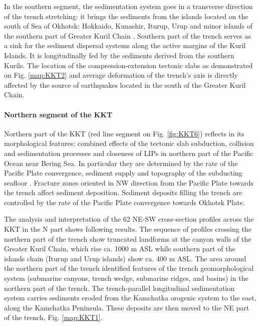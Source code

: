 \documentclass[11pt,a4paper]{report}
\begin{document}
{In the southern segment, the sedimentation system goes in a transverse direction of the trench stretching: it brings the sediments from the islands located on the south of Sea of Okhotsk: Hokkaido, Kunashir, Iturup, Urup and minor islands of the southern part of Greater Kuril Chain \cite{Lemenkova202011}. Southern part of the trench serves as a sink for the sediment dispersal systems along the active margins of the Kuril Islands. It is longitudinally fed by the sediments derived from the southern Kurils. The location of the compression-extension tectonic slabs as demonstrated on Fig. \ref{map:KKT2} and average deformation of the trench’s axis is directly affected by the source of earthquakes located in the south of the Greater Kuril Chain.

\paragraph{Northern segment of the \ac{KKT}}
Northern part of the \ac{KKT} (red line segment on Fig. \ref{fig:KKT6}) reflects in its morphological features: combined effects of the tectonic slab subduction, collision and sedimentation processes and closeness of \ac{LIPs} in northern part of the Pacific Ocean near Bering Sea. In particular they are determined by the rate of the Pacific Plate convergence, sediment supply and topography of the subducting seafloor \cite{Lemenkova202001}. Fracture zones oriented in NW direction from the Pacific Plate towards the trench affect sediment deposition. Sediment deposits filling the trench are controlled by the rate of the Pacific Plate convergence towards Okhotsk Plate. 

The analysis and interpretation of the 62 NE-SW cross-section profiles across the \ac{KKT} in the N part shows following results. The sequence of profiles crossing the northern part of the trench show truncated landforms at the canyon walls of the Greater Kuril Chain, which rise ca. 1000 m \ac{ASL} while southern part of the islands chain (Iturup and Urup islands) show ca. 400 m \ac{ASL}.  The area around the northern part of the trench identified features of the trench geomorphological system (submarine canyons, trench wedge, submarine ridges, and basins) in the northern part of the trench. The trench-parallel longitudinal sedimentation system carries sediments eroded from the Kamchatka orogenic system to the east, along the Kamchatka Peninsula. These deposits are then moved to the NE part of the trench, Fig. \ref{map:KKT1}.

}
\end{document}
